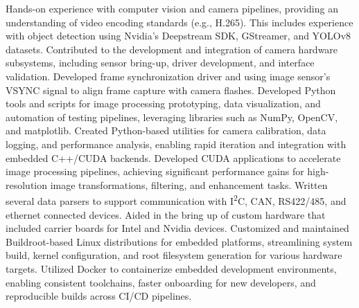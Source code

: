 \documentclass[letterpaper,MMMyyyy,nonstopmode]{simpleresumecv}
\begin{document}
\begin{Body}
    \begin{Detail}
        \BulletItem
        Hands-on experience with computer vision and camera pipelines, providing an understanding of video encoding standards (e.g., H.265). This includes experience with object detection using Nvidia's Deepstream SDK, GStreamer, and YOLOv8 datasets.
        \vspace{2mm}
        \BulletItem
        Contributed to the development and integration of camera hardware subsystems, including sensor bring-up, driver development, and interface validation.
        \vspace{2mm}
        \BulletItem
        Developed frame synchronization driver and using image sensor's VSYNC signal to align frame capture with camera flashes.
        \vspace{2mm}
        \BulletItem
        Developed Python tools and scripts for image processing prototyping, data visualization, and automation of testing pipelines, leveraging libraries such as NumPy, OpenCV, and matplotlib.
        \vspace{2mm}
        \BulletItem
        Created Python-based utilities for camera calibration, data logging, and performance analysis, enabling rapid iteration and integration with embedded C++/CUDA backends.
        \vspace{2mm}
        \BulletItem
        Developed CUDA applications to accelerate image processing pipelines, achieving significant performance gains for high-resolution image transformations, filtering, and enhancement tasks.
        \vspace{2mm}
        \BulletItem
        Written several data parsers to support communication with I\textsuperscript{2}C, CAN, RS422/485, and ethernet connected devices.
        \vspace{2mm}
        \BulletItem
        Aided in the bring up of custom hardware that included carrier boards for Intel and Nvidia devices.
        \vspace{2mm}
        \BulletItem
        Customized and maintained Buildroot-based Linux distributions for embedded platforms, streamlining system build, kernel configuration, and root filesystem generation for various hardware targets.
        \vspace{2mm}
        \BulletItem
        Utilized Docker to containerize embedded development environments, enabling consistent toolchains, faster onboarding for new developers, and reproducible builds across CI/CD pipelines.
        \vspace{2mm}
    \end{Detail}


\end{Body}
\end{document}
